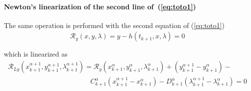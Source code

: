 
 \paragraph{Newton's linearization of the second  line of~(\ref{eq:toto1})}
The same operation is performed with the second equation of (\ref{eq:toto1})
\begin{equation}
  \begin{array}{l}
    \mathcal R_y(x,y,\lambda)=y-h(t_{k+1},x,\lambda) =0\\ \\
  \end{array}
\end{equation}
which is linearized as
\begin{equation}
  \label{eq:NL9}
  \begin{array}{l}
    \mathcal R_{Ly}(x^{\alpha+1}_{k+1},y^{\alpha+1}_{k+1},\lambda^{\alpha+1}_{k+1}) = \mathcal
    R_{y}(x^{\alpha}_{k+1},y^{\alpha}_{k+1},\lambda^{\alpha}_{k+1}) +
    (y^{\alpha+1}_{k+1}-y^{\alpha}_{k+1})- \\[2mm] \qquad  \qquad \qquad \qquad  \qquad \qquad
    C^{\alpha}_{k+1}(x^{\alpha+1}_{k+1}-x^{\alpha}_{k+1}) - D^{\alpha}_{k+1}(\lambda^{\alpha+1}_{k+1}-\lambda^{\alpha}_{k+1})=0
  \end{array}
\end{equation}

